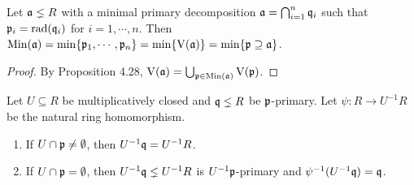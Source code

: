 \begin{proposition}
    Let $\mathfrak{a} \lneq R$ with a minimal primary decomposition $\mathfrak{a} = \bigcap_{i=1}^{n} \mathfrak{q}_i$ such that $\mathfrak{p}_i = \operatorname{rad}(\mathfrak{q}_i)$ for $i = 1,\cdots,n$. Then $\operatorname{Min}(\mathfrak{a}) = \min\{\mathfrak{p}_1,\cdots,\mathfrak{p}_n\} = \min\{\operatorname{V}(\mathfrak{a})\} = \min\{\mathfrak{p} \supseteq \mathfrak{a}\}$. 
\end{proposition}

\begin{proof}
    By Proposition 4.28, $\operatorname{V}(\mathfrak{a}) = \bigcup_{\mathfrak{p} \in \operatorname{Min}(\mathfrak{a})} \operatorname{V}(\mathfrak{p})$. 
\end{proof}

\begin{lemma}
    Let $U \subseteq R$ be multiplicatively closed and $\mathfrak{q} \lneq R$ be $\mathfrak{p}$-primary. Let $\psi: R \to U^{-1}R$ be the natural ring homomorphism.
    \begin{enumerate}
        \item If $U \cap \mathfrak{p} \neq \emptyset$, then $U^{-1}\mathfrak{q} = U^{-1}R$.
        \item If $U \cap \mathfrak{p} = \emptyset$, then $U^{-1}\mathfrak{q} \lneq U^{-1}R$ is $U^{-1}\mathfrak{p}$-primary and $\psi^{-1}(U^{-1}\mathfrak{q}) = \mathfrak{q}$.
    \end{enumerate}
\end{lemma}

